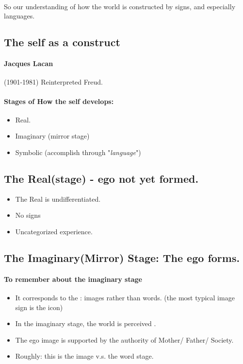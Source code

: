 \documentclass{article}
\begin{document}
	\paragraph{} So our understanding of how the world is constructed by signs, and especially languages.
	
	\subsection{The self as a construct}
	\paragraph{Jacques Lacan}(1901-1981) Reinterpreted Freud.
	\paragraph{Stages of How the self develops:}
	\begin{itemize}
	    \item Real.
	    \item Imaginary (mirror stage)
	    \item Symbolic (accomplish through "\emph{language}")
	\end{itemize}
	
	\subsection{The Real(stage) - ego not yet formed.}
	\begin{itemize}
    	\item The Real is undifferentiated.
    	\item No signs
    	\item Uncategorized experience.
	\end{itemize}
	
	\subsection{The Imaginary(Mirror) Stage: The ego forms.}
	\paragraph{To remember about the imaginary stage}
	\begin{itemize}
	    \item It corresponds to the : images rather than words. (the most typical image sign is the icon)
	    \item In the imaginary stage, the world is perceived .
	    \item The ego image is supported by the authority of Mother/ Father/ Society.
	    \item Roughly: this is the image v.s. the word stage.
	\end{itemize}
	
\end{document}
